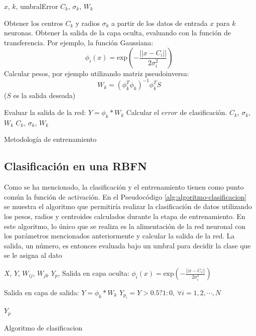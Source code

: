 \documentclass[journal]{IEEEtran}
\begin{document}
\begin{algorithm} 
\footnotesize
\begin{algorithmic}[1] 
\REQUIRE  $x$, $k$, umbralError
\ENSURE $C_k$, $\sigma _k$, $W_k$

\REPEAT
\STATE Obtener los centros $C_k$ y radios $\sigma _k$ a partir de los datos de entrada $x$ para $k$ neuronas.
\STATE Obtener la salida de la capa oculta, evaluando con la función de transferencia. 
Por ejemplo, la función Gaussiana:
$$
\phi_i (x) = \text{exp}(-\frac{||x-C_i||}{2\sigma_i^2})
$$
\STATE Calcular pesos, por ejemplo utilizando matriz pseudoinversa:
$$
W_k = (\phi _k^T \phi _k)^{-1} \phi _k^T S
$$
($S$ es la salida deseada)

\STATE Evaluar la salida de la red: $Y = \phi _k * W_k$
\STATE Calcular el $error$ de clasificación.
	\RETURN $C_k$, $\sigma _k$, $W_k$
\ENDIF
{}
\RETURN $C_k$, $\sigma _k$, $W_k$
\end{algorithmic} 
\caption{Metodología de entrenamiento} 
\label{alg:algoritmo-entrenamiento}
\end{algorithm}


\subsection{Clasificación en una RBFN} %
\label{sub:clasificaci_n_en_una_rna}
Como se ha mencionado, la clasificación y el entrenamiento tienen como punto común la función de activación.
En el Pseudocódigo \ref{alg:algoritmo-clasificacion} se muestra el algoritmo que permitiría realizar la clasificación de datos utilizando los pesos, radios y centroides calculados durante la etapa de entrenamiento.
En este algoritmo, lo único que se realiza es la alimentación de la red neuronal con los parámetros mencionados anteriormente y calcular la salida de la red.
La salida, un número, es entonces evaluada bajo un umbral para decidir la clase que se le asigna al dato


\begin{algorithm} 
\footnotesize
\begin{algorithmic}[1] 
\REQUIRE  $X$, $Y$, $W_{ij}$, $W_{jk}$
\ENSURE $Y_p$, 
\STATE Salida en capa oculta:
\STATE $\phi_i (x) = \text{exp}(-\frac{||x-C_i||}{2\sigma_i^2})$

\STATE Salida en capa de salida:
\STATE $Y = \phi _k * W_k$
\STATE $Y_{p_i} = Y > 0.5? 1 : 0, ~\forall i = 1,2,\cdots,N$

\RETURN $Y_p$
\end{algorithmic} 
\caption{Algoritmo de clasificacion} 
\label{alg:algoritmo-clasificacion}
\end{algorithm}
\end{document}
